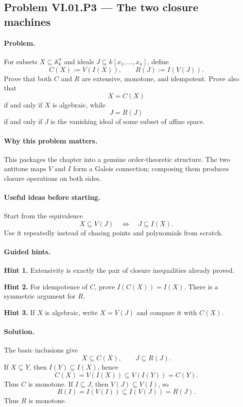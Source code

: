 \subsection*{Problem VI.01.P3 --- The two closure machines}
\label{prob:vi01-p3}

\paragraph{Problem.}
For subsets \(X\subseteq\mathbb A_k^n\) and ideals \(J\subseteq k[x_1,\dots,x_n]\), define
\[
C(X):=V(I(X)),
\qquad
R(J):=I(V(J)).
\]
Prove that both \(C\) and \(R\) are extensive, monotone, and idempotent.  Prove also that
\[
X=C(X)
\]
if and only if \(X\) is algebraic, while
\[
J=R(J)
\]
if and only if \(J\) is the vanishing ideal of some subset of affine space.

\ifdefined\FullProblemDossiers
\paragraph{Why this problem matters.}
This packages the chapter into a genuine order-theoretic structure.  The two antitone maps
\(V\) and \(I\) form a Galois connection; composing them produces closure operations on
both sides.

\paragraph{Useful ideas before starting.}
Start from the equivalence
\[
X\subseteq V(J)\quad\Longleftrightarrow\quad J\subseteq I(X).
\]
Use it repeatedly instead of chasing points and polynomials from scratch.

\paragraph{Guided hints.}
\textbf{Hint 1.} Extensivity is exactly the pair of closure inequalities already proved.

\textbf{Hint 2.} For idempotence of \(C\), prove \(I(C(X))=I(X)\).  There is a symmetric
argument for \(R\).

\textbf{Hint 3.} If \(X\) is algebraic, write \(X=V(J)\) and compare it with \(C(X)\).

\paragraph{Solution.}
The basic inclusions give
\[
X\subseteq C(X),
\qquad
J\subseteq R(J).
\]
If \(X\subseteq Y\), then \(I(Y)\subseteq I(X)\), hence
\[
C(X)=V(I(X))\subseteq V(I(Y))=C(Y).
\]
Thus \(C\) is monotone.  If \(I\subseteq J\), then \(V(J)\subseteq V(I)\), so
\[
R(I)=I(V(I))\subseteq I(V(J))=R(J).
\]
Thus \(R\) is monotone.

